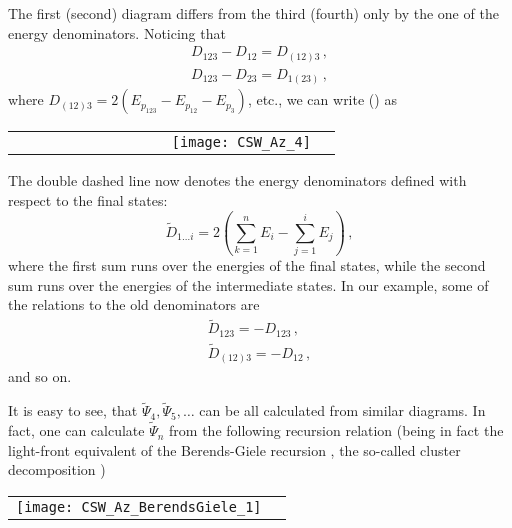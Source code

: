\documentclass[english,american]{article}
\newcommand\myref{\refstepcounter{equation}\theequation}
\newcommand{\refmyref}[1]{\newcounter{#1}\setcounter{#1}{\theequation}}
\begin{document}
\noindent The first (second) diagram differs from the third (fourth)
only by the one of the energy denominators. Noticing that 
\begin{gather}
D_{123}-D_{12}=D_{\left(12\right)3}\,,\\
D_{123}-D_{23}=D_{1\left(23\right)}\,,
\end{gather}
where $D_{\left(12\right)3}=2\left(E_{p_{123}}-E_{p_{12}}-E_{p_{3}}\right)$, 
etc., we can write () as

\begin{flushleft}
\begin{tabular}{>{\centering}m{}>{\centering}m{}}
\bigskip{}


\raggedright{}$\,\,\,\,\,\,\,\,\,\,\,\,\,\,\,\,\,\,\,\,\,\,\,\,\,\,\,\,\,\,\,\,\,\,\,\:\,\,\,\,\,\,\,\,\,\,\,\,\,\,\,\,\,\,\,\,\,\,$\texttt{[image: CSW\_Az\_4]} & \centering{}\centering{(\myref )}
\refmyref{Psi3_diag_2}\tabularnewline
\end{tabular}
\par\end{flushleft}

\noindent The double dashed line now denotes the energy denominators defined
with respect to the final states:
\begin{equation}
\tilde{D}_{1\dots i}=2\left(\sum_{k=1}^{n}E_{i}-\sum_{j=1}^{i}E_{j}\right)\,,\label{eq:Dtilde_def}
\end{equation}
where the first sum runs over the energies of the final states, while the second sum runs over the energies of the intermediate states. In our example, some of the relations to the old denominators are 
\begin{gather}
\tilde{D}_{123}=-D_{123}\,,\\
\tilde{D}_{\left(12\right)3}=-D_{12}\,,
\end{gather}
and so on. 

It is easy to see, that $\tilde{\Psi}_{4},\tilde{\Psi}_{5},\dots$
can be all calculated from similar diagrams. In fact, one can calculate
$\tilde{\Psi}_{n}$ from the following recursion relation (being in
fact the light-front equivalent of the Berends-Giele recursion \citep{Berends:1987me},  the so-called cluster decomposition \citep{Brodsky1986})

\begin{tabular}{>{\raggedleft}m{}>{\centering}m{}}
\medskip{}


\raggedright{}\centerline{\texttt{[image: CSW\_Az\_BerendsGiele\_1]}} & \centering{}\centering{(\myref )}
\refmyref{Psin_BerendsGiele}\tabularnewline
\end{tabular}
\end{document}

